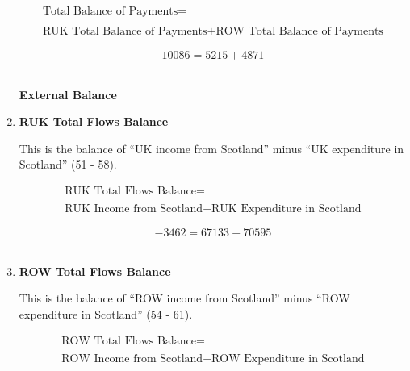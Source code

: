 \begin{enumerate}
\begin{equation}
\begin{split}
\text{Total Balance of Payments} =  \\ \\
\text{RUK Total Balance of Payments}+\text{ROW Total Balance of Payments}
\end{split} \label{eq:2.5.75}
\end{equation}

\begin{equation} \nonumber
10086 = 5215+4871
\end{equation}\\



\pagebreak

\begin{center}
\textbf{\LARGE External Balance}
\end{center}

\item \textbf {RUK Total Flows Balance}

This is the balance of ``UK income from Scotland'' minus ``UK expenditure in Scotland'' (51 - 58).

\begin{equation}
\begin{split}
\text{RUK Total Flows Balance} =  \\ \\
\text{RUK Income from Scotland}- \text{RUK Expenditure in Scotland}
\end{split} \label{eq:2.5.76}
\end{equation}

\begin{equation} \nonumber
-3462 = 67133-70595
\end{equation}\\


\item \textbf {ROW Total Flows Balance}

This is the balance of ``ROW income from Scotland'' minus ``ROW expenditure in Scotland'' (54 - 61).

\begin{equation}
\begin{split}
\text{ROW Total Flows Balance} =  \\ \\
\text{ROW Income from Scotland}- \text{ROW Expenditure in Scotland}
\end{split} \label{eq:2.5.77}
\end{equation}


\end{enumerate}
